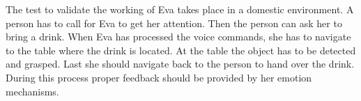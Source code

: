 \documentclass[project_eva.tex]{subfiles}
\begin{document}
The test to validate the working of Eva takes place in a domestic environment. A person has to call for Eva to get her attention. Then the person can ask her to bring a drink. When Eva has processed the voice commands, she has to navigate to the table where the drink is located. At the table the object has to be detected and grasped. Last she should navigate back to the person to hand over the drink. During this process proper feedback should be provided by her emotion mechanisms.
\end{document}
